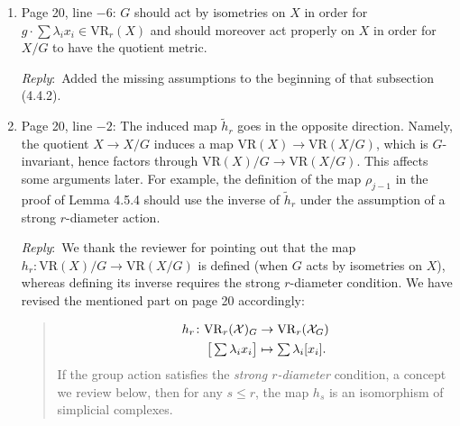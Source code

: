 \documentclass{amsart}
\newcommand{\ar}{\medskip\noindent\textit{Reply}:\ }
\begin{document}
\begin{enumerate}
		\smallskip

		At the end of \S4.3.3, we added the following phrase, to clarify how the barcode of a single sphere
		is the special case of Figure~2:

		\begin{quote}
			..., corresponding to $u_n=1$ and $u_i=0$ for $i\neq n$.
		\end{quote}

		\smallskip

		At the end of .4, we add the following sentences:

		\begin{quote}
			In particular, each $m$-sphere summand contributes a bar $(0,\zeta_m)$
			to $\Hbarc[\field]{m}{\VS^{u_1,\dots,u_n}}$,
			and this occurs with multiplicity $u_m$.
			Since $\zeta_1 > \dots > \zeta_n$,
			the smallest threshold $\zeta_n$ determines the vertical dashed line
			in Figure~2.
		\end{quote}

		\item Page 20, line $-6$: $G$ should act by isometries on $X$ in order for $g \cdot \sum \lambda_i x_i \in \mathrm{VR}_r(X)$ and should moreover act properly on $X$ in order for $X/G$ to have the quotient metric.

		\ar Added the missing assumptions to the beginning of that subsection (4.4.2).

		\item Page 20, line $-2$: The induced map $\tilde{h}_r$ goes in the opposite direction. Namely, the quotient $X \to X/G$ induces a map $\mathrm{VR}(X) \to \mathrm{VR}(X/G)$, which is $G$-invariant, hence factors through $\mathrm{VR}(X)/G \to \mathrm{VR}(X/G)$. This affects some arguments later. For example, the definition of the map $\rho_{j-1}$ in the proof of Lemma 4.5.4 should use the inverse of $\tilde{h}_r$ under the assumption of a strong $r$-diameter action.

		\ar We thank the reviewer for pointing out that the map $h_r:\mathrm{VR}(X)/G \to \mathrm{VR}(X/G)$ is defined (when $G$ acts by isometries on $X$), whereas defining its inverse requires the strong $r$-diameter condition. We have revised the mentioned part on page 20 accordingly:
		\begin{quote}
			\begin{align*}
				h_r \colon \mathrm{VR}_r(\mathcal{X})_G &\to  \mathrm{VR}_r(\mathcal{X}_G) \\
				\textstyle \big[\sum\lambda_i x_i\big] & \mapsto \textstyle\sum\lambda_i [x_i].
			\end{align*}
			If the group action satisfies the \textit{strong \(r\)-diameter} condition, a concept we review below, then for any \(s \leq r\), the map $h_s$ is an isomorphism of simplicial complexes.
		\end{quote}


\end{enumerate}
\end{document}
